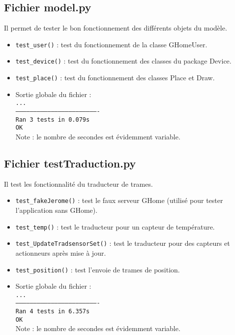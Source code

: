 \subsection{Fichier model.py}

Il permet de tester le bon fonctionnement des différents objets du modèle.

\begin{itemize}
	\item \texttt{test\_user()} : test du fonctionnement de la classe GHomeUser.
	\item \texttt{test\_device()} : test du fonctionnement des classes du package Device.
	\item \texttt{test\_place()} : test du fonctionnement des classes Place et Draw.
	\item Sortie globale du fichier :\\
	\texttt{...}\\
	\texttt{----------------------------------------------------------------------}\\
	\texttt{Ran 3 tests in 0.079s}\\
	\newline{}
	\texttt{OK}\\
	Note : le nombre de secondes est évidemment variable.
\end{itemize}

\subsection{Fichier testTraduction.py}
Il test les fonctionnalité du traducteur de trames.

\begin{itemize}
	\item \texttt{test\_fakeJerome()} : test le faux serveur GHome (utilisé pour tester l'application sans GHome).
	\item \texttt{test\_temp()} : test le traducteur pour un capteur de température.
	\item \texttt{test\_UpdateTradsensorSet()} : test le traducteur pour des capteurs et actionneurs après mise à jour.
	\item \texttt{test\_position()} : test l'envoie de trames de position.
	\item Sortie globale du fichier :\\
	\texttt{...}\\
	\texttt{----------------------------------------------------------------------}\\
	\texttt{Ran 4 tests in 6.357s}\\
	\newline{}
	\texttt{OK}\\
	Note : le nombre de secondes est évidemment variable.
\end{itemize}


